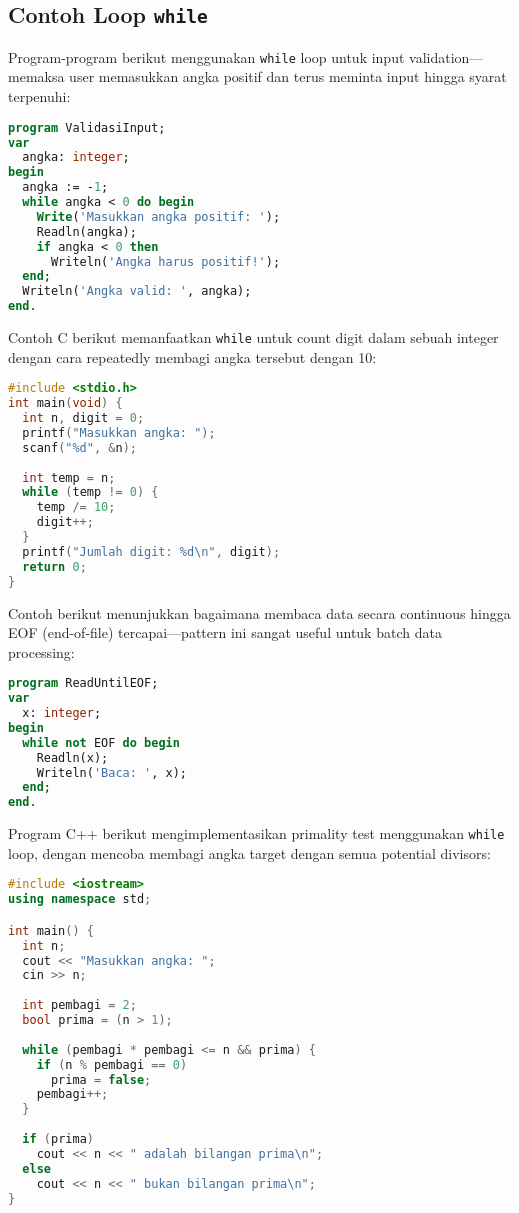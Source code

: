 \documentclass[../main.tex]{subfiles}
\begin{document}
\subsection{Contoh Loop \texttt{while}}

Program-program berikut menggunakan \texttt{while} loop untuk input validation—memaksa user memasukkan angka positif dan terus meminta input hingga syarat terpenuhi:

\begin{lstlisting}[language=Pascal, caption={Input validasi dengan while (Pascal)}]
program ValidasiInput;
var
  angka: integer;
begin
  angka := -1;
  while angka < 0 do begin
    Write('Masukkan angka positif: ');
    Readln(angka);
    if angka < 0 then
      Writeln('Angka harus positif!');
  end;
  Writeln('Angka valid: ', angka);
end.
\end{lstlisting}

Contoh C berikut memanfaatkan \texttt{while} untuk count digit dalam sebuah integer dengan cara repeatedly membagi angka tersebut dengan 10:

\begin{lstlisting}[language=C, caption={Hitung digit dengan while (C)}]
#include <stdio.h>
int main(void) {
  int n, digit = 0;
  printf("Masukkan angka: ");
  scanf("%d", &n);
  
  int temp = n;
  while (temp != 0) {
    temp /= 10;
    digit++;
  }
  printf("Jumlah digit: %d\n", digit);
  return 0;
}
\end{lstlisting}

Contoh berikut menunjukkan bagaimana membaca data secara continuous hingga EOF (end-of-file) tercapai—pattern ini sangat useful untuk batch data processing:

\begin{lstlisting}[language=Pascal, caption={Baca hingga EOF (Pascal)}]
program ReadUntilEOF;
var
  x: integer;
begin
  while not EOF do begin
    Readln(x);
    Writeln('Baca: ', x);
  end;
end.
\end{lstlisting}

Program C++ berikut mengimplementasikan primality test menggunakan \texttt{while} loop, dengan mencoba membagi angka target dengan semua potential divisors:

\begin{lstlisting}[language=C++, caption={Hitung bilangan prima dengan while (C++)}]
#include <iostream>
using namespace std;

int main() {
  int n;
  cout << "Masukkan angka: ";
  cin >> n;
  
  int pembagi = 2;
  bool prima = (n > 1);
  
  while (pembagi * pembagi <= n && prima) {
    if (n % pembagi == 0)
      prima = false;
    pembagi++;
  }
  
  if (prima)
    cout << n << " adalah bilangan prima\n";
  else
    cout << n << " bukan bilangan prima\n";
}
\end{lstlisting}
\end{document}
